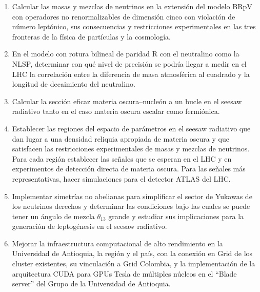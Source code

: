\begin{enumerate}
\item 
\begin{bbrpvlhc}
  Calcular las masas y mezclas de neutrinos en la extensión del modelo
  BRpV con operadores no renormalizables de dimensión cinco con
  violación de número leptónico, sus consecuencias y restricciones
  experimentales en las tres fronteras de la física de partículas y la
  cosmología.
\end{bbrpvlhc}
\label{item:bbrpvlhc1}
\item 
\begin{brpvlhc}  
  En el modelo con rotura bilineal de paridad R con el neutralino
  como la NLSP, determinar con qué nivel de precisión se podría llegar
  a medir en el LHC la correlación entre la diferencia de masa
  atmosférica al cuadrado y la longitud de decaimiento del neutralino.
\end{brpvlhc}
\label{item:bbrpvlhc2}
\item 
\begin{darkmatter}
  Calcular la sección eficaz materia oscura--nucleón a un bucle en el
  seesaw radiativo tanto en el caso materia oscura escalar como
  fermiónica.
\end{darkmatter}

\item 
\begin{darkmatter}
  Establecer las regiones del espacio de parámetros en el seesaw
  radiativo que dan lugar a una densidad reliquia apropiada
  de materia oscura y que satisfacen las restricciones
  experimentales de masas y mezclas de neutrinos. Para cada región
  establecer las señales que se esperan en el LHC y en experimentos de
  detección directa de materia oscura.  Para las señales más
  representativas, hacer simulaciones para el detector ATLAS del LHC.
\end{darkmatter}
\label{item:darkmatter1}

\item 
\begin{darkmatter}
  Implementar simetrías no abelianas para simplificar el sector de
  Yukawas de los neutrinos derechos y determinar las condiciones
  bajo las cuales se puede tener un ángulo de mezcla $\theta_{13}$
  grande y estudiar sus implicaciones para la generación de
  leptogénesis en el seesaw radiativo.
\end{darkmatter}
\label{item:darkmatter2}

\item Mejorar la infraestructura computacional de alto rendimiento en
  la Universidad de Antioquia, la región y el país, con la conexión en
  Grid de los cluster existentes, su vinculación a Grid Colombia, y la
  implementación de la arquitectura CUDA para GPUs Tesla de múltiples
  núcleos en el ``Blade server'' del Grupo de la Universidad de
  Antioquia.
\label{item:grid}
\end{enumerate}

